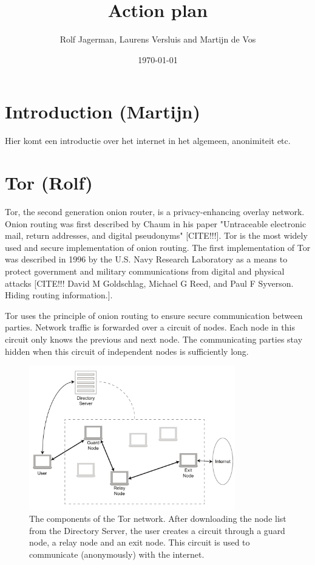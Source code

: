 \documentclass[11pt]{article}
\title{Action plan}
\author{Rolf Jagerman, Laurens Versluis and Martijn de Vos}
\date{\today}
\begin{document}
\maketitle

\pagebreak

\section{Introduction (Martijn)}
Hier komt een introductie over het internet in het algemeen, anonimiteit etc.

\pagebreak
\section{Tor (Rolf)}
	Tor, the second generation onion router, is a privacy-enhancing overlay network. Onion routing was first described by Chaum in his paper "Untraceable electronic mail, return addresses, and digital pseudonyms" [CITE!!!]. Tor is the most widely used and secure implementation of onion routing. The first implementation of Tor was described in 1996 by the U.S. Navy Research Laboratory as a means to protect government and military communications from digital and physical attacks [CITE!!! David M Goldschlag, Michael G Reed, and Paul F Syverson. Hiding routing information.].
	
	Tor uses the principle of onion routing to ensure secure communication between parties. Network traffic is forwarded over a circuit of nodes. Each node in this circuit only knows the previous and next node. The communicating parties stay hidden when this circuit of independent nodes is sufficiently long.
	
	\begin{figure}[!t]
		\centering
		\includegraphics[width=0.8\textwidth]{graphics/tor.pdf}
		\caption{The components of the Tor network. After downloading the node list from the Directory Server, the user creates a circuit through a guard node, a relay node and an exit node. This circuit is used to communicate (anonymously) with the internet.}
		\label{fig:tor_layout}
	\end{figure}
	
\end{document}

